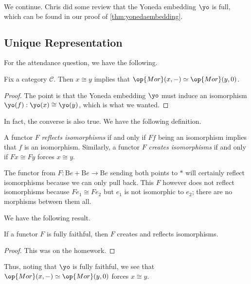 
We continue. Chris did some review that the Yoneda embedding $\yo$ is full, which can be found in our proof of \autoref{thm:yonedaembedding}.

\subsection{Unique Representation}
For the attendance question, we have the following.
\begin{proposition}
	Fix a category $\mathcal C$. Then $x\cong y$ implies that $\op{Mor}(x,-)\simeq\op{Mor}(y,0)$.
\end{proposition}
\begin{proof}
	The point is that the Yoneda embedding $\yo$ must induce an isomorphism $\yo(f):\yo(x)\cong\yo(y)$, which is what we wanted.
\end{proof}
In fact, the converse is also true. We have the following definition.
\begin{definition}
	A functor $F$ \textit{reflects isomorphisms} if and only if $Ff$ being an isomorphism implies that $f$ is an isomorphism. Similarly, a functor $F$ \textit{creates isomorphisms} if and only if $Fx\cong Fy$ forces $x\cong y$.
\end{definition}
\begin{example}
	The functor from $F:\mathrm Be+\mathrm Be\to\mathrm Be$ sending both points to $*$ will certainly reflect isomorphisms because we can only pull back. This $F$ however does not reflect isomorphisms because $Fe_1\cong Fe_2$ but $e_1$ is not isomorphic to $e_2$; there are no morphisms between them all.
\end{example}
We have the following result.
\begin{proposition}
	If a functor $F$ is fully faithful, then $F$ creates and reflects isomorphisms.
\end{proposition}
\begin{proof}
	This was on the homework.
\end{proof}
\begin{remark}
	Thus, noting that $\yo$ is fully faithful, we see that $\op{Mor}(x,-)\simeq\op{Mor}(y,0)$ forces $x\cong y$.
\end{remark}

